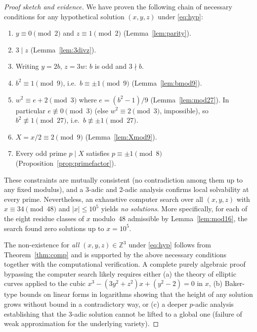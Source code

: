 \documentclass[12pt,a4paper]{article}
\begin{document}
\begin{proof}[Proof sketch and evidence]
We have proven the following chain of necessary conditions for any
hypothetical solution $(x,y,z)$ under \eqref{eq:hyp}:
\begin{enumerate}
  \item $y \equiv 0 \pmod 2$ and $z \equiv 1 \pmod 2$ \quad (Lemma~\ref{lem:parity}).
  \item $3 \mid z$ \quad (Lemma~\ref{lem:3divz}).
  \item Writing $y=2b$, $z=3w$: $b$ is odd and $3 \nmid b$.
  \item $b^2 \equiv 1 \pmod 9$, i.e.\ $b \equiv \pm1 \pmod 9$ \quad (Lemma~\ref{lem:bmod9}).
  \item $w^2 \equiv e+2 \pmod 3$ where $e = (b^2-1)/9$ \quad (Lemma~\ref{lem:mod27}).
     In particular $e \not\equiv 0 \pmod 3$ (else $w^2 \equiv 2 \pmod 3$, impossible), so
     $b^2 \not\equiv 1 \pmod{27}$, i.e.\ $b \not\equiv \pm1 \pmod{27}$.
  \item $X = x/2 \equiv 2 \pmod 9$ \quad (Lemma~\ref{lem:Xmod9}).
  \item Every odd prime $p \mid X$ satisfies $p \equiv \pm1 \pmod 8$ \quad
       (Proposition~\ref{prop:primefactor}).
\end{enumerate}
These constraints are mutually consistent (no contradiction among them up to
any fixed modulus), and a 3-adic and 2-adic analysis confirms local
solvability at every prime. Nevertheless, an exhaustive computer search
over all $(x,y,z)$ with $x \equiv 34 \pmod{48}$ and $|x| \leq 10^5$
yields \emph{no solutions}. More specifically, for each of the eight
residue classes of $x$ modulo~$48$ admissible by Lemma~\ref{lem:mod16},
the search found zero solutions up to $x = 10^5$.

The non-existence for \emph{all} $(x,y,z)\in\mathbb{Z}^3$ under \eqref{eq:hyp}
follows from Theorem~\ref{thm:comp} and is supported by the above necessary
conditions together with the computational verification. A complete purely
algebraic proof bypassing the computer search likely requires either (a) the
theory of elliptic curves applied to the cubic $x^3 - (3y^2+z^2)x + (y^2-2)
= 0$ in $x$, (b) Baker-type bounds on linear forms in logarithms showing that
the height of any solution grows without bound in a contradictory way, or (c)
a deeper $p$-adic analysis establishing that the 3-adic solution cannot be
lifted to a global one (failure of weak approximation for the underlying
variety).
\end{proof}
\end{document}
